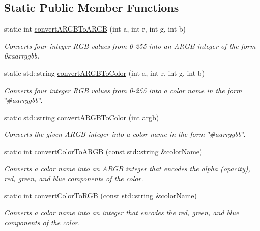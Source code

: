 \subsection*{Static Public Member Functions}
\begin{DoxyCompactItemize}
\item 
static int \mbox{\hyperlink{classsgl_1_1GColor_a9678f670b71cc46a68b746bda9765f4b}{convert\+A\+R\+G\+B\+To\+A\+R\+GB}} (int a, int r, int g, int b)
\begin{DoxyCompactList}\small\item\em Converts four integer R\+GB values from 0-\/255 into an A\+R\+GB integer of the form {\ttfamily 0xaarrggbb}. \end{DoxyCompactList}\item 
static std\+::string \mbox{\hyperlink{classsgl_1_1GColor_abc3a0188f264217b768e4a9a63fbc54e}{convert\+A\+R\+G\+B\+To\+Color}} (int a, int r, int g, int b)
\begin{DoxyCompactList}\small\item\em Converts four integer R\+GB values from 0-\/255 into a color name in the form {\ttfamily \char`\"{}\#aarrggbb\char`\"{}}. \end{DoxyCompactList}\item 
static std\+::string \mbox{\hyperlink{classsgl_1_1GColor_aba032cfdc6b7936c6b828f8dfc2a9a90}{convert\+A\+R\+G\+B\+To\+Color}} (int argb)
\begin{DoxyCompactList}\small\item\em Converts the given A\+R\+GB integer into a color name in the form {\ttfamily \char`\"{}\#aarrggbb\char`\"{}}. \end{DoxyCompactList}\item 
static int \mbox{\hyperlink{classsgl_1_1GColor_a5efa1612c4ccfff89eca4ed3cfd0206d}{convert\+Color\+To\+A\+R\+GB}} (const std\+::string \&color\+Name)
\begin{DoxyCompactList}\small\item\em Converts a color name into an A\+R\+GB integer that encodes the alpha (opacity), red, green, and blue components of the color. \end{DoxyCompactList}\item 
static int \mbox{\hyperlink{classsgl_1_1GColor_aab4a1480d396f913220aea51d117eb94}{convert\+Color\+To\+R\+GB}} (const std\+::string \&color\+Name)
\begin{DoxyCompactList}\small\item\em Converts a color name into an integer that encodes the red, green, and blue components of the color. \end{DoxyCompactList}\item 

\end{DoxyCompactItemize}
